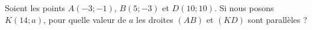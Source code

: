 
\begin{exercice}\label{exosmath-0691}

    Soient les points \( A(-3;-1)\), \( B(5;-3)\) et \( D(10;10)\). Si nous posons \( K(14;a)\), pour quelle valeur de \( a\) les droites \( (AB)\) et \( (KD)\) sont parallèles ?

\end{exercice}
